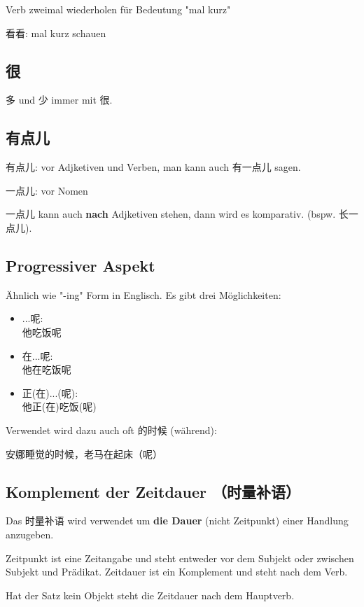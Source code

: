 \documentclass[UTF8]{ctexart}
\begin{document}
Verb zweimal wiederholen für Bedeutung "mal kurz"

看看: mal kurz schauen

\subsection{很}

多 und 少 immer mit 很.

\subsection{有点儿}

有点儿: vor Adjketiven und Verben, man kann auch 有一点儿 sagen.

一点儿: vor Nomen

一点儿 kann auch \textbf{nach} Adjketiven stehen, dann wird es komparativ. (bspw. 长一点儿). 

\subsection{Progressiver Aspekt}

Ähnlich wie "-ing" Form in Englisch. Es gibt drei Möglichkeiten:

\begin{itemize}
    \item ...呢:\\他吃饭呢
    \item 在...呢:\\他在吃饭呢
    \item 正(在)...(呢):\\他正(在)吃饭(呢)
\end{itemize}

Verwendet wird dazu auch oft 的时候 (während):

安娜睡觉的时候，老马在起床（呢）

\subsection{Komplement der Zeitdauer （时量补语）}

Das 时量补语 wird verwendet um \textbf{die Dauer} (nicht Zeitpunkt) einer Handlung anzugeben.

Zeitpunkt ist eine Zeitangabe und steht entweder vor dem Subjekt oder zwischen Subjekt
und Prädikat. Zeitdauer ist ein Komplement und steht nach dem Verb.

Hat der Satz kein Objekt steht die Zeitdauer nach dem Hauptverb.
\end{document}
